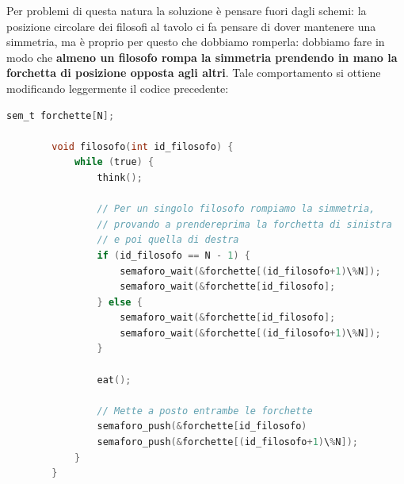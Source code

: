 \documentclass[12pt]{report}
\begin{document}
	Per problemi di questa natura la soluzione è pensare fuori dagli schemi: la posizione circolare dei filosofi al tavolo ci fa pensare di dover mantenere una simmetria, ma è proprio per questo che dobbiamo romperla: dobbiamo fare in modo che \textbf{almeno un filosofo rompa la simmetria prendendo in mano la forchetta di posizione opposta agli altri}. Tale comportamento si ottiene modificando leggermente il codice precedente:
	\begin{lstlisting}[language=C]
		sem_t forchette[N];
		
		void filosofo(int id_filosofo) {
			while (true) {
				think();
				
				// Per un singolo filosofo rompiamo la simmetria,
				// provando a prendereprima la forchetta di sinistra
				// e poi quella di destra
				if (id_filosofo == N - 1) {
					semaforo_wait(&forchette[(id_filosofo+1)\%N]);
					semaforo_wait(&forchette[id_filosofo];
				} else {
					semaforo_wait(&forchette[id_filosofo];	
					semaforo_wait(&forchette[(id_filosofo+1)\%N]);
				}
				
				eat();
				
				// Mette a posto entrambe le forchette
				semaforo_push(&forchette[id_filosofo)
				semaforo_push(&forchette[(id_filosofo+1)\%N]);
			}
		}
	\end{lstlisting}
	
\end{document}
